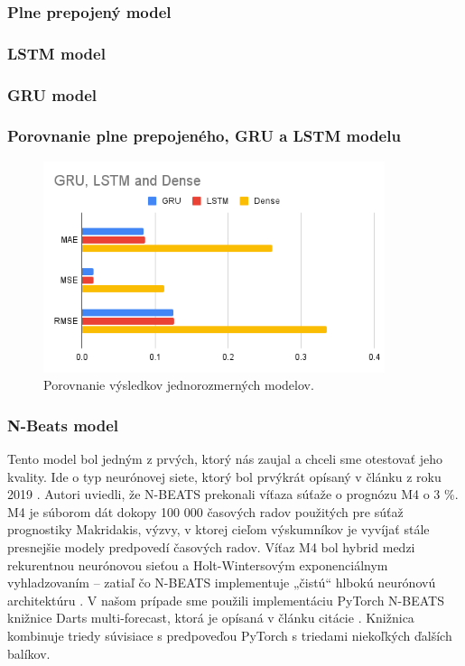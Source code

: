 \subsubsection{Plne prepojený model} 
\subsubsection{LSTM model} 
\subsubsection{GRU model} 
\subsubsection{Porovnanie plne prepojeného, GRU a LSTM modelu}
\begin{figure}[!htbp]
  \centering
  \includegraphics[width=10cm]{img/GRU, LSTM and Dense.png}
  \caption{Porovnanie výsledkov jednorozmerných modelov.}
  \label{univariate}
\end{figure}

\subsubsection{N-Beats model} 
Tento model bol jedným z prvých, ktorý nás zaujal a chceli sme otestovať jeho kvality. Ide o typ neurónovej siete, ktorý bol prvýkrát opísaný v článku z roku 2019 \cite{n-beats}. Autori uviedli, že N-BEATS prekonali víťaza súťaže o prognózu M4 o 3 \%. M4 je súborom dát dokopy 100 000 časových radov použitých pre súťaž prognostiky Makridakis, výzvy, v ktorej cieľom výskumníkov je vyvíjať stále presnejšie modely predpovedí časových radov. Víťaz M4 bol hybrid medzi rekurentnou neurónovou sieťou a Holt-Wintersovým exponenciálnym vyhladzovaním – zatiaľ čo N-BEATS implementuje „čistú“ hlbokú neurónovú architektúru \cite{m4}. V našom prípade sme použili implementáciu PyTorch N-BEATS knižnice Darts multi-forecast, ktorá je opísaná v článku citácie \cite{beat-impl}. Knižnica kombinuje triedy súvisiace s predpoveďou PyTorch s triedami niekoľkých ďalších balíkov. 

